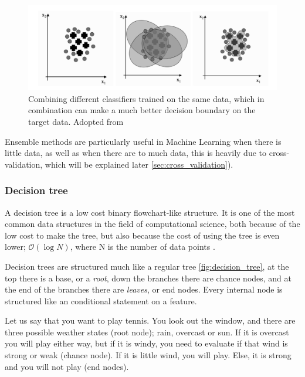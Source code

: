\begin{figure}[h]
     \centering
     \includegraphics[width=\linewidth]{theory/figures/ensemble_learning.png}
     \caption{Combining different classifiers trained on the same data, which in combination can make a much better decision boundary on the target data. Adopted from \cite{marsland2014machine}}
     \label{fig:ensemble_learning}
\end{figure}	

Ensemble methods are particularly useful in Machine Learning when there is little data, as well as when there are to much data, this is heavily due to cross-validation, which will be explained later \ref{sec:cross_validation}). 

\subsubsection{Decision tree}

A decision tree is a low cost binary flowchart-like structure. It is one of the most common data structures in the field of computational science, both because of the low cost to make the tree, but also because the cost of using the tree is even lower; $\mathcal{O}(\log{N})$, where N is the number of data points \cite{marsland2014machine}. 

Decision trees are structured much like a regular tree \ref{fig:decision_tree}, at the top there is a base, or a \textit{root}, down the branches there are chance nodes, and at the end of the branches there are \textit{leaves}, or end nodes. Every internal node is structured like an conditional statement on a feature.

Let us say that you want to play tennis. You look out the window, and there are three possible weather states (root node); rain, overcast or sun. If it is overcast you will play either way, but if it is windy, you need to evaluate if that wind is strong or weak (chance node). If it is little wind, you will play. Else, it is strong and you will not play (end nodes). 

